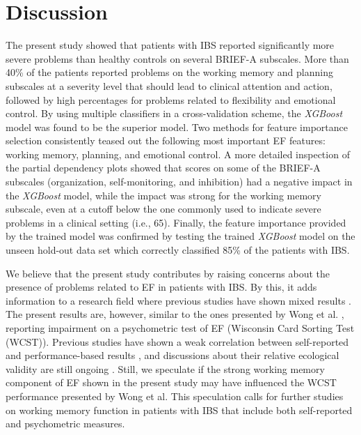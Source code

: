 \documentclass[jcm,article,submit,pdftex,moreauthors]{Definitions/mdpi}
\begin{document}
\section{Discussion}
The present study showed that patients with IBS reported significantly more severe problems than healthy controls on several BRIEF-A subscales. More than 40\% of the patients reported problems on the working memory and planning subscales at a severity level that should lead to clinical attention and action, followed by high percentages for problems related to flexibility and emotional control. 
By using multiple classifiers in a cross-validation scheme, the \textit{XGBoost} model was found to be the superior model. Two methods for feature importance selection consistently teased out the following most important EF features: working memory, planning, and emotional control. 
 A more detailed inspection of the partial dependency plots showed that scores on some of the BRIEF-A subscales (organization, self-monitoring, and inhibition) had a negative impact in the \textit{XGBoost} model, while the impact was strong for the working memory subscale, even at a cutoff below the one commonly used to indicate severe problems in a clinical setting (i.e., 65). Finally, the feature importance provided by the trained model was confirmed by testing the trained \textit{XGBoost} model on the unseen hold-out data set which correctly classified 85\% of the patients with IBS. 
  


We believe that the present study contributes by raising concerns about the presence of problems related to EF in patients with IBS. By this, it adds information to a research field where previous studies have shown mixed results \cite{lam2019cognitive}. The present results are, however, similar to the ones presented by Wong et al. \cite{wong2019nature}, reporting impairment on a psychometric test of EF (Wisconsin Card Sorting Test (WCST)). Previous studies have shown a weak correlation between self-reported and performance-based results \cite{meltzer2017association},  and discussions about their relative ecological validity are still ongoing  \cite{malo2022psychological}. Still, we speculate if the strong working memory component of EF shown in the present study may have influenced the WCST performance presented by Wong et al. This speculation calls for further studies on working memory function in patients with IBS that include both self-reported and psychometric measures.
\end{document}
